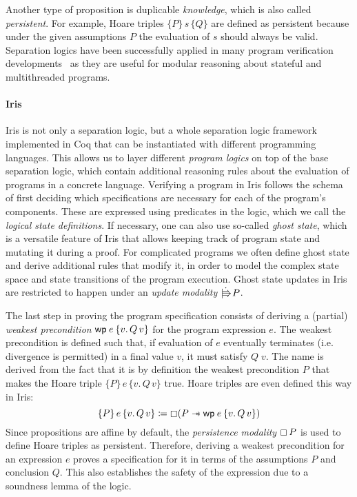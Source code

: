 Another type of proposition is duplicable \emph{knowledge}, which is also called \emph{persistent}.
For example, Hoare triples \(\{P\}\,s\,\{Q\}\) are defined as persistent because under the given assumptions \(P\) the evaluation of \(s\) should always be valid.
Separation logics have been successfully applied in many program verification developments~\cite{?,?,?} as they are useful for modular reasoning about stateful and multithreaded programs.

\paragraph{Iris}
Iris is not only a separation logic, but a whole separation logic framework implemented in Coq that can be instantiated with different programming languages.
This allows us to layer different \emph{program logics} on top of the base separation logic, which contain additional reasoning rules about the evaluation of programs in a concrete language.
Verifying a program in Iris follows the schema of first deciding which specifications are necessary for each of the program's components.
These are expressed using predicates in the logic, which we call the \emph{logical state definitions}.
If necessary, one can also use so-called \emph{ghost state},
which is a versatile feature of Iris that allows keeping track of program state and mutating it during a proof.
For complicated programs we often define ghost state and derive additional rules that modify it, in order to model the complex state space and state transitions of the program execution.
Ghost state updates in Iris are restricted to happen under an \emph{update modality} \(\upd P\).

The last step in proving the program specification consists of deriving a (partial) \emph{weakest precondition} \(\wpre{e}{v.\, Q\, v}\) for the program expression \(e\).
The weakest precondition is defined such that, if evaluation of \(e\) eventually terminates (i.e. divergence is permitted) in a final value \(v\), it must satisfy \(Q\; v\).
The name is derived from the fact that it is by definition the weakest precondition \(P\) that makes the Hoare triple \(\{P\}\,e\,\{v.\,Q\,v\}\) true.
Hoare triples are even defined this way in Iris:
\[
    \{P\}\,e\,\{v.\,Q\,v\} \coloneq \always (P \wand \wpre{e}{v.\, Q\, v})
\]
Since propositions are affine by default, the \emph{persistence modality} \(\mathop{\boxempty} P\) is used to define Hoare triples as persistent.
Therefore, deriving a weakest precondition for an expression \(e\) proves a specification for it in terms of the assumptions \(P\) and conclusion \(Q\).
This also establishes the safety of the expression due to a soundness lemma of the logic.

